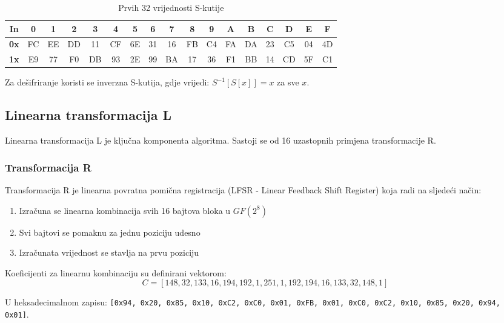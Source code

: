 \documentclass[12pt,a4paper]{article}
\begin{document}
\begin{table}[H]
\centering
\caption{Prvih 32 vrijednosti S-kutije}
\label{tab:sbox}
\begin{tabular}{|c|c|c|c|c|c|c|c|c|c|c|c|c|c|c|c|c|}
\hline
\textbf{In} & 0 & 1 & 2 & 3 & 4 & 5 & 6 & 7 & 8 & 9 & A & B & C & D & E & F \\
\hline
\textbf{0x} & FC & EE & DD & 11 & CF & 6E & 31 & 16 & FB & C4 & FA & DA & 23 & C5 & 04 & 4D \\
\hline
\textbf{1x} & E9 & 77 & F0 & DB & 93 & 2E & 99 & BA & 17 & 36 & F1 & BB & 14 & CD & 5F & C1 \\
\hline
\end{tabular}
\end{table}

Za dešifriranje koristi se inverzna S-kutija, gdje vrijedi: $S^{-1}[S[x]] = x$ za sve $x$.

\subsection{Linearna transformacija L}

Linearna transformacija L je ključna komponenta algoritma. Sastoji se od 16 uzastopnih primjena transformacije R.

\subsubsection{Transformacija R}

Transformacija R je linearna povratna pomična registracija (LFSR - Linear Feedback Shift Register) koja radi na sljedeći način:

\begin{enumerate}
    \item Izračuna se linearna kombinacija svih 16 bajtova bloka u $GF(2^8)$
    \item Svi bajtovi se pomaknu za jednu poziciju udesno
    \item Izračunata vrijednost se stavlja na prvu poziciju
\end{enumerate}

Koeficijenti za linearnu kombinaciju su definirani vektorom:
\begin{equation}
    C = [148, 32, 133, 16, 194, 192, 1, 251, 1, 192, 194, 16, 133, 32, 148, 1]
\end{equation}

U heksadecimalnom zapisu: \texttt{[0x94, 0x20, 0x85, 0x10, 0xC2, 0xC0, 0x01, 0xFB, 0x01, 0xC0, 0xC2, 0x10, 0x85, 0x20, 0x94, 0x01]}.
\end{document}
